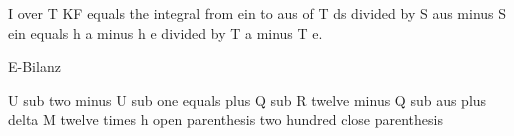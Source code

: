 I over T KF equals the integral from ein to aus of T ds divided by S aus minus S ein equals h a minus h e divided by T a minus T e.

E-Bilanz

U sub two minus U sub one equals plus Q sub R twelve minus Q sub aus plus delta M twelve times h open parenthesis two hundred close parenthesis